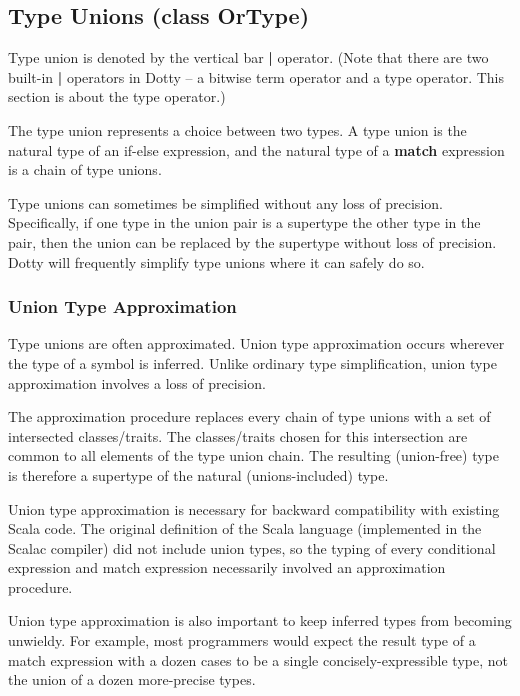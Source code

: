 \documentclass[11pt]{report}
\newcommand{\cdf}{\bf\ttfamily} %
\newcommand{\cd}{\cdf\small}  %
\begin{document}
\subsection{Type Unions (class OrType)} \label{sec:type-union}

Type union is denoted by the vertical bar {\cd |} operator. (Note that there are two built-in {\cd |} operators in Dotty -- a bitwise term operator and a type operator. This section is about the type operator.) 

The type union represents a choice between two types. A type union is the natural type of an if-else expression, and the natural type of a {\cd match} expression is a chain of type unions.

Type unions can sometimes be simplified without any loss of precision. Specifically, if one type in the union pair is a supertype the other type in the pair, then the union can be replaced by the supertype without loss of precision. Dotty will frequently simplify type unions where it can safely do so.

\subsubsection{Union Type Approximation}

Type unions are often approximated. Union type approximation occurs wherever the type of a symbol is inferred. Unlike ordinary type simplification, union type approximation involves a loss of precision.

The approximation procedure replaces every chain of type unions with a set of intersected classes/traits. The classes/traits chosen for this intersection are common to all elements of the type union chain. The resulting (union-free) type is therefore a supertype of the natural (unions-included) type.

Union type approximation is necessary for backward compatibility with existing Scala code. The original definition of the Scala language (implemented in the Scalac compiler) did not include union types, so the typing of every conditional expression and match expression necessarily involved an approximation procedure.

Union type approximation is also important to keep inferred types from becoming unwieldy. For example, most programmers would expect the result type of a match expression with a dozen cases to be a single concisely-expressible type, not the union of a dozen more-precise types.
\end{document}
